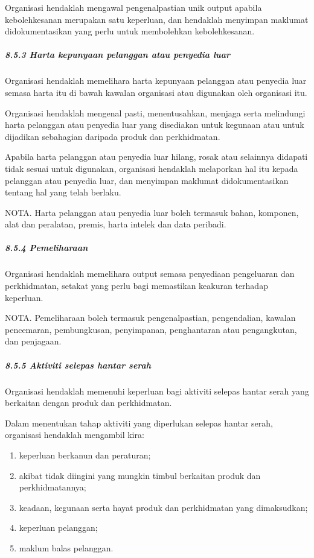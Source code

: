 \documentclass[
]{article}
\begin{document}
Organisasi hendaklah mengawal pengenalpastian unik output apabila
kebolehkesanan merupakan satu keperluan, dan hendaklah menyimpan
maklumat didokumentasikan yang perlu untuk membolehkan kebolehkesanan.

\hypertarget{harta-kepunyaan-pelanggan-atau-penyedia-luar}{%
\subparagraph{8.5.3 Harta kepunyaan pelanggan atau penyedia
luar}\label{harta-kepunyaan-pelanggan-atau-penyedia-luar}}

Organisasi hendaklah memelihara harta kepunyaan pelanggan atau penyedia
luar semasa harta itu di bawah kawalan organisasi atau digunakan oleh
organisasi itu.

Organisasi hendaklah mengenal pasti, menentusahkan, menjaga serta
melindungi harta pelanggan atau penyedia luar yang disediakan untuk
kegunaan atau untuk dijadikan sebahagian daripada produk dan
perkhidmatan.

Apabila harta pelanggan atau penyedia luar hilang, rosak atau selainnya
didapati tidak sesuai untuk digunakan, organisasi hendaklah melaporkan
hal itu kepada pelanggan atau penyedia luar, dan menyimpan maklumat
didokumentasikan tentang hal yang telah berlaku.

NOTA. Harta pelanggan atau penyedia luar boleh termasuk bahan, komponen,
alat dan peralatan, premis, harta intelek dan data peribadi.

\hypertarget{pemeliharaan}{%
\subparagraph{8.5.4 Pemeliharaan}\label{pemeliharaan}}

Organisasi hendaklah memelihara output semasa penyediaan pengeluaran dan
perkhidmatan, setakat yang perlu bagi memastikan keakuran terhadap
keperluan.

NOTA. Pemeliharaan boleh termasuk pengenalpastian, pengendalian, kawalan
pencemaran, pembungkusan, penyimpanan, penghantaran atau pengangkutan,
dan penjagaan.

\hypertarget{aktiviti-selepas-hantar-serah}{%
\subparagraph{8.5.5 Aktiviti selepas hantar
serah}\label{aktiviti-selepas-hantar-serah}}

Organisasi hendaklah memenuhi keperluan bagi aktiviti selepas hantar
serah yang berkaitan dengan produk dan perkhidmatan.

Dalam menentukan tahap aktiviti yang diperlukan selepas hantar serah,
organisasi hendaklah mengambil kira:

\begin{enumerate}
\def\labelenumi{\alph{enumi})}
\item
  keperluan berkanun dan peraturan;
\item
  akibat tidak diingini yang mungkin timbul berkaitan produk dan
  perkhidmatannya;
\item
  keadaan, kegunaan serta hayat produk dan perkhidmatan yang
  dimaksudkan;
\item
  keperluan pelanggan;
\item
  maklum balas pelanggan.
\end{enumerate}
\end{document}

